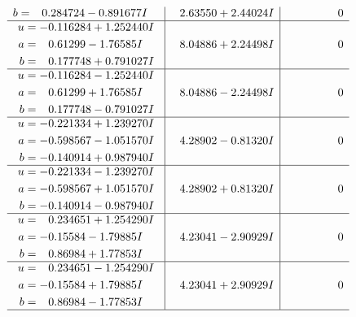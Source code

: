 \documentclass[1p]{elsarticle_modified}
\theoremstyle{definition}
\begin{document}
$$\begin{array}{c|c|c}
\begin{aligned}
b &= \phantom{-}0.284724 - 0.891677 I\end{aligned}
 & \phantom{-}2.63550 + 2.44024 I & \phantom{-0.000000 } 0 \\ \hline\begin{aligned}
u &= -0.116284 + 1.252440 I \\
a &= \phantom{-}0.61299 - 1.76585 I \\
b &= \phantom{-}0.177748 + 0.791027 I\end{aligned}
 & \phantom{-}8.04886 + 2.24498 I & \phantom{-0.000000 } 0 \\ \hline\begin{aligned}
u &= -0.116284 - 1.252440 I \\
a &= \phantom{-}0.61299 + 1.76585 I \\
b &= \phantom{-}0.177748 - 0.791027 I\end{aligned}
 & \phantom{-}8.04886 - 2.24498 I & \phantom{-0.000000 } 0 \\ \hline\begin{aligned}
u &= -0.221334 + 1.239270 I \\
a &= -0.598567 - 1.051570 I \\
b &= -0.140914 + 0.987940 I\end{aligned}
 & \phantom{-}4.28902 - 0.81320 I & \phantom{-0.000000 } 0 \\ \hline\begin{aligned}
u &= -0.221334 - 1.239270 I \\
a &= -0.598567 + 1.051570 I \\
b &= -0.140914 - 0.987940 I\end{aligned}
 & \phantom{-}4.28902 + 0.81320 I & \phantom{-0.000000 } 0 \\ \hline\begin{aligned}
u &= \phantom{-}0.234651 + 1.254290 I \\
a &= -0.15584 - 1.79885 I \\
b &= \phantom{-}0.86984 + 1.77853 I\end{aligned}
 & \phantom{-}4.23041 - 2.90929 I & \phantom{-0.000000 } 0 \\ \hline\begin{aligned}
u &= \phantom{-}0.234651 - 1.254290 I \\
a &= -0.15584 + 1.79885 I \\
b &= \phantom{-}0.86984 - 1.77853 I\end{aligned}
 & \phantom{-}4.23041 + 2.90929 I & \phantom{-0.000000 } 0\\
 \hline 
 \end{array}$$\newpage$$\begin{array}{c|c|c}  

\end{array}$$
\end{document}
